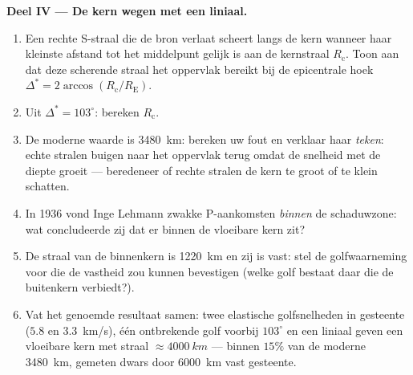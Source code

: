 \begin{problem}
\medskip\noindent\textbf{Deel IV --- De kern wegen met een liniaal.}
\begin{enumerate}[resume]
  \item Een rechte S-straal die de bron verlaat scheert langs de kern
        wanneer haar kleinste afstand tot het middelpunt gelijk is aan
        de kernstraal $R_{\text{c}}$. Toon aan dat deze scherende
        straal het oppervlak bereikt bij de epicentrale hoek
        $\Delta^* =
        2\arccos(R_{\text{c}}/R_{\text{E}})$.
  \item Uit $\Delta^* = 103^\circ$: bereken $R_{\text{c}}$.
  \item De moderne waarde is \qty{3480}{km}: bereken uw fout en
        verklaar haar \emph{teken}: echte stralen buigen naar het
        oppervlak terug omdat de snelheid met de diepte groeit ---
        beredeneer of rechte stralen de kern te groot of te klein
        schatten.
  \item In 1936 vond Inge Lehmann zwakke P-aankomsten \emph{binnen} de
        schaduwzone: wat concludeerde zij dat er binnen de vloeibare
        kern zit?
  \item De straal van de binnenkern is \qty{1220}{km} en zij is vast:
        stel de golfwaarneming voor die de vastheid zou kunnen
        bevestigen (welke golf bestaat daar die de buitenkern
        verbiedt?).
  \item Vat het genoemde resultaat samen: twee elastische
        golfsnelheden in gesteente ($5.8$ en \qty{3.3}{km/s}), één
        ontbrekende golf voorbij $103^\circ$ en een liniaal geven een
        vloeibare kern met straal $\approx \qty{4000}{km}$ --- binnen
        $15\%$ van de moderne \qty{3480}{km}, gemeten dwars door
        \qty{6000}{km} vast gesteente.
\end{enumerate}
\end{problem}
